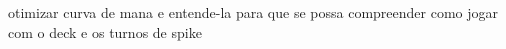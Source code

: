 otimizar curva de mana e entende-la para que se possa compreender como jogar com o deck e os turnos de spike